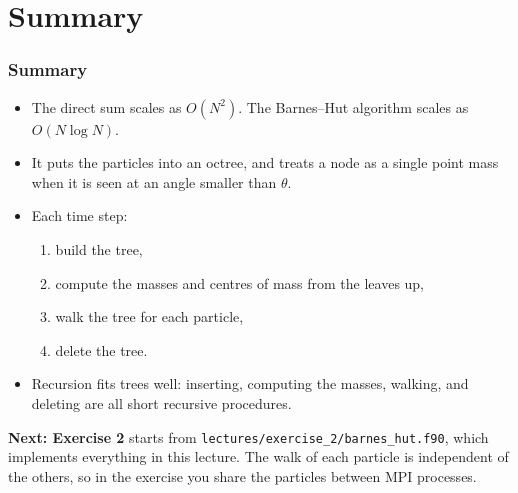 \section{Summary}

\begin{frame}
  \frametitle{Summary}
  \begin{itemize}
    \item The direct sum scales as $O(N^2)$. The Barnes--Hut algorithm scales as $O(N \log N)$.
    \item It puts the particles into an octree, and treats a node as a single point mass when it is seen at an angle smaller than $\theta$.
    \item Each time step:
      \begin{enumerate}
        \item build the tree,
        \item compute the masses and centres of mass from the leaves up,
        \item walk the tree for each particle,
        \item delete the tree.
      \end{enumerate}
    \item Recursion fits trees well: inserting, computing the masses, walking, and deleting are all short recursive procedures.
  \end{itemize}

  \vspace*{2mm}
  \textbf{Next: Exercise 2} starts from \texttt{lectures/exercise\_2/barnes\_hut.f90}, which implements everything in this lecture. The walk of each particle is independent of the others, so in the exercise you share the particles between MPI processes.
\end{frame}


